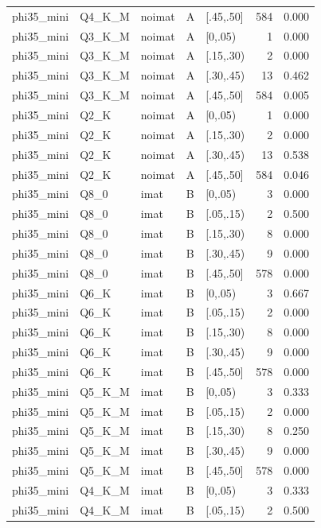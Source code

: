 \begin{tabular}{lllllrr}
phi35\_mini & Q4\_K\_M & noimat & A & [.45,.50] & 584 & 0.000 \\
phi35\_mini & Q3\_K\_M & noimat & A & [0,.05) & 1 & 0.000 \\
phi35\_mini & Q3\_K\_M & noimat & A & [.15,.30) & 2 & 0.000 \\
phi35\_mini & Q3\_K\_M & noimat & A & [.30,.45) & 13 & 0.462 \\
phi35\_mini & Q3\_K\_M & noimat & A & [.45,.50] & 584 & 0.005 \\
phi35\_mini & Q2\_K & noimat & A & [0,.05) & 1 & 0.000 \\
phi35\_mini & Q2\_K & noimat & A & [.15,.30) & 2 & 0.000 \\
phi35\_mini & Q2\_K & noimat & A & [.30,.45) & 13 & 0.538 \\
phi35\_mini & Q2\_K & noimat & A & [.45,.50] & 584 & 0.046 \\
phi35\_mini & Q8\_0 & imat & B & [0,.05) & 3 & 0.000 \\
phi35\_mini & Q8\_0 & imat & B & [.05,.15) & 2 & 0.500 \\
phi35\_mini & Q8\_0 & imat & B & [.15,.30) & 8 & 0.000 \\
phi35\_mini & Q8\_0 & imat & B & [.30,.45) & 9 & 0.000 \\
phi35\_mini & Q8\_0 & imat & B & [.45,.50] & 578 & 0.000 \\
phi35\_mini & Q6\_K & imat & B & [0,.05) & 3 & 0.667 \\
phi35\_mini & Q6\_K & imat & B & [.05,.15) & 2 & 0.000 \\
phi35\_mini & Q6\_K & imat & B & [.15,.30) & 8 & 0.000 \\
phi35\_mini & Q6\_K & imat & B & [.30,.45) & 9 & 0.000 \\
phi35\_mini & Q6\_K & imat & B & [.45,.50] & 578 & 0.000 \\
phi35\_mini & Q5\_K\_M & imat & B & [0,.05) & 3 & 0.333 \\
phi35\_mini & Q5\_K\_M & imat & B & [.05,.15) & 2 & 0.000 \\
phi35\_mini & Q5\_K\_M & imat & B & [.15,.30) & 8 & 0.250 \\
phi35\_mini & Q5\_K\_M & imat & B & [.30,.45) & 9 & 0.000 \\
phi35\_mini & Q5\_K\_M & imat & B & [.45,.50] & 578 & 0.000 \\
phi35\_mini & Q4\_K\_M & imat & B & [0,.05) & 3 & 0.333 \\
phi35\_mini & Q4\_K\_M & imat & B & [.05,.15) & 2 & 0.500 \\

\end{tabular}
